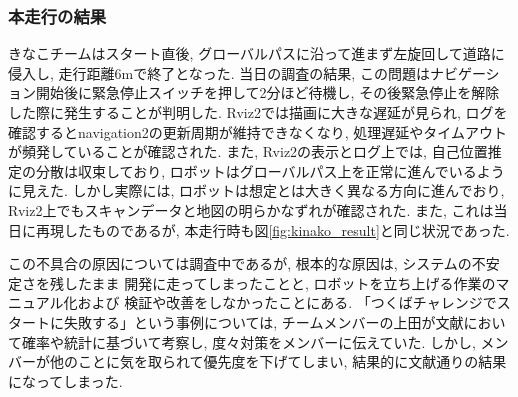 \subsubsection{本走行の結果}
きなこチームはスタート直後, 
グローバルパスに沿って進まず左旋回して道路に侵入し, 
走行距離6mで終了となった. 
当日の調査の結果, 
この問題はナビゲーション開始後に緊急停止スイッチを押して2分ほど待機し, 
その後緊急停止を解除した際に発生することが判明した. 
Rviz2では描画に大きな遅延が見られ, 
ログを確認するとnavigation2の更新周期が維持できなくなり, 
処理遅延やタイムアウトが頻発していることが確認された. 
また, Rviz2の表示とログ上では, 自己位置推定の分散は収束しており, 
ロボットはグローバルパス上を正常に進んでいるように見えた. 
しかし実際には, ロボットは想定とは大きく異なる方向に進んでおり, 
Rviz2上でもスキャンデータと地図の明らかなずれが確認された. 
また, これは当日に再現したものであるが, 
本走行時も図\ref{fig:kinako_result}と同じ状況であった. 

この不具合の原因については調査中であるが, 
根本的な原因は, システムの不安定さを残したまま
開発に走ってしまったことと, 
ロボットを立ち上げる作業のマニュアル化および
検証や改善をしなかったことにある. 
「つくばチャレンジでスタートに失敗する」という事例については, 
チームメンバーの上田が文献\cite{上田確率}において確率や統計に基づいて考察し, 
度々対策をメンバーに伝えていた. しかし, 
メンバーが他のことに気を取られて優先度を下げてしまい, 
結果的に文献通りの結果になってしまった. 


